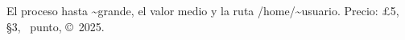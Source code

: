 \documentclass[12pt]{article}
\begin{document}
El proceso hasta \textasciitilde grande, el valor medio y la ruta /home/\textasciitilde usuario. Precio: \pounds 5, \S 3, \textbullet\ punto, \copyright\ 2025.
\end{document}

